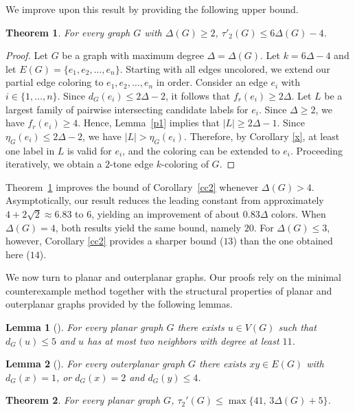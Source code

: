 \documentclass[12pt]{article}
\theoremstyle{plain}
\newtheorem{theorem}{Theorem}
\numberwithin{theorem}{section}
\numberwithin{conjecture}{section}
\numberwithin{corollary}{section}
\numberwithin{example}{section}
\newtheorem{lemma}{Lemma}
\numberwithin{lemma}{section}
\numberwithin{proposition}{section}
\numberwithin{problem}{section}
\numberwithin{remark}{section}
\numberwithin{claim}{theorem}
\numberwithin{definition}{section}
\begin{document}
We improve upon this result by providing the following upper bound.

\begin{theorem}\label{t1}
For every graph $G$ with $\Delta(G) \ge 2$, $\tau'_2(G) \le 6\Delta(G) - 4$.
\end{theorem}

\begin{proof}
Let $G$ be a graph with maximum degree $\Delta = \Delta(G)$. Let $k=6\Delta-4$ and let $E(G)=\{e_1,e_2,\dots,e_n\}$. Starting with all edges uncolored, we extend our partial edge coloring to $e_1,e_2,\dots,e_n$ in order. Consider an edge $e_i$ with $i\in\{1,\dots,n\}$. Since $d_G(e_i)\le 2\Delta-2$, it follows that $f_r(e_i)\ge 2\Delta$. Let $L$ be a largest family of pairwise intersecting candidate labels for $e_i$. Since $\Delta\ge2$, we have $f_r(e_i)\ge4$. Hence, Lemma~\ref{p1} implies that $|L|\ge2\Delta-1$. Since $\eta_G(e_i) \le 2\Delta -2$, we have $|L|>\eta_G(e_i)$. Therefore, by Corollary \ref{x}, at least one label in $L$ is valid for $e_i$, and the coloring can be extended to $e_i$. Proceeding iteratively, we obtain a $2$-tone edge $k$-coloring of $G$.\end{proof}

Theorem~\ref{t1} improves the bound of Corollary~\ref{cc2} whenever $\Delta(G)>4$. Asymptotically, our result reduces the leading constant from approximately $4 + 2\sqrt{2} \approx 6.83$ to $6$, yielding an improvement of about $0.83\Delta$ colors. When $\Delta(G) = 4$, both results yield the same bound, namely $20$. For $\Delta(G) \le 3$, however, Corollary \ref{cc2} provides a sharper bound ($13$) than the one obtained here ($14$).

We now turn to planar and outerplanar graphs. Our proofs rely on the minimal counterexample method together with the structural properties of planar and outerplanar graphs provided by the following lemmas.

\begin{lemma}[\cite{B}]\label{l2}
For every planar graph $G$ there exists $u \in V(G)$ such that $d_G(u) \le 5$ and $u$ has at most two neighbors with degree at least $11$.
\end{lemma}

\begin{lemma}[\cite{FA}]\label{l3'}
For every outerplanar graph $G$ there exists $xy \in E(G)$ with $d_G(x) = 1$, or $d_G(x) = 2$ and $d_G(y) \le 4$.
\end{lemma}

\begin{theorem}
For every planar graph $G$, $\tau_2'(G) \le \max\{41,\,3\Delta(G)+5\}$.
\end{theorem}
\end{document}
